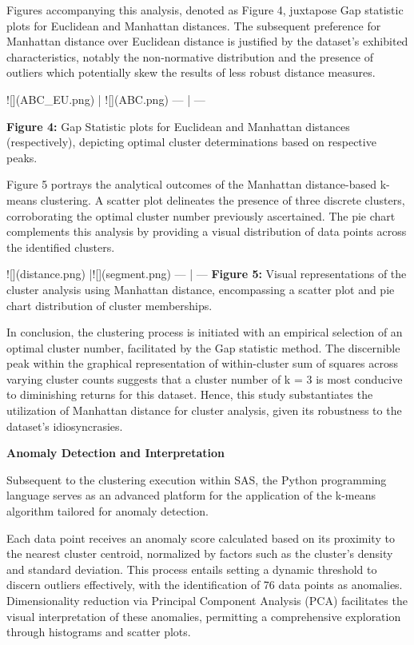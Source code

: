 \documentclass{sigkddExp}
\begin{document}
Figures accompanying this analysis, denoted as Figure 4, juxtapose Gap statistic plots for Euclidean and Manhattan distances. The subsequent preference for Manhattan distance over Euclidean distance is justified by the dataset's exhibited characteristics, notably the non-normative distribution and the presence of outliers which potentially skew the results of less robust distance measures.


![](ABC_EU.png) | ![](ABC.png)
--- | --- 

\textbf{Figure 4:} Gap Statistic plots for Euclidean and Manhattan distances (respectively), depicting optimal cluster determinations based on respective peaks.

Figure 5 portrays the analytical outcomes of the Manhattan distance-based k-means clustering. A scatter plot delineates the presence of three discrete clusters, corroborating the optimal cluster number previously ascertained. The pie chart complements this analysis by providing a visual distribution of data points across the identified clusters.

![](distance.png) |![](segment.png)
--- | --- 
\textbf{Figure 5:} Visual representations of the cluster analysis using Manhattan distance, encompassing a scatter plot and pie chart distribution of cluster memberships.

In conclusion, the clustering process is initiated with an empirical selection of an optimal cluster number, facilitated by the Gap statistic method. The discernible peak within the graphical representation of within-cluster sum of squares across varying cluster counts suggests that a cluster number of k = 3 is most conducive to diminishing returns for this dataset. Hence, this study substantiates the utilization of Manhattan distance for cluster analysis, given its robustness to the dataset's idiosyncrasies.




\textbf{Anomaly Detection and Interpretation}

Subsequent to the clustering execution within SAS, the Python programming language serves as an advanced platform for the application of the k-means algorithm tailored for anomaly detection.

Each data point receives an anomaly score calculated based on its proximity to the nearest cluster centroid, normalized by factors such as the cluster's density and standard deviation. This process entails setting a dynamic threshold to discern outliers effectively, with the identification of 76 data points as anomalies. Dimensionality reduction via Principal Component Analysis (PCA) facilitates the visual interpretation of these anomalies, permitting a comprehensive exploration through histograms and scatter plots.
\end{document}
